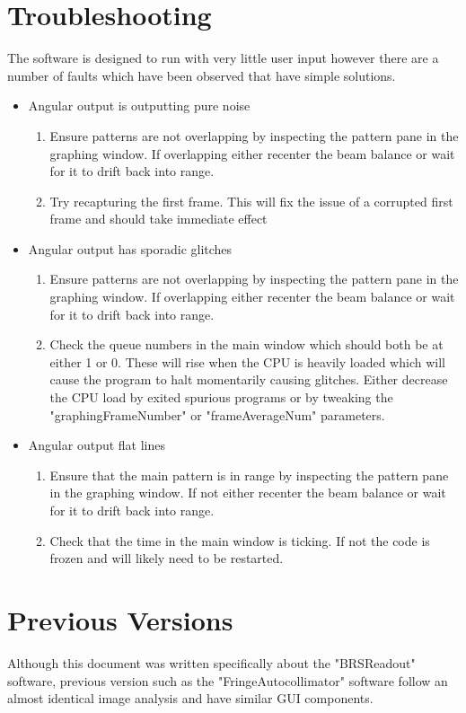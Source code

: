 \documentclass{article}
\begin{document}
\section{Troubleshooting}
The software is designed to run with very little user input however there are a number of faults which have been observed that have simple solutions.
\begin{itemize}
\item Angular output is outputting pure noise
\begin{enumerate}
\item Ensure patterns are not overlapping by inspecting the pattern pane in the graphing window. If overlapping either recenter the beam balance or wait for it to drift back into range.
\item Try recapturing the first frame. This will fix the issue of a corrupted first frame and should take immediate effect
\end{enumerate}
\item Angular output has sporadic glitches
\begin{enumerate}
\item Ensure patterns are not overlapping by inspecting the pattern pane in the graphing window. If overlapping either recenter the beam balance or wait for it to drift back into range.
\item Check the queue numbers in the main window which should both be at either 1 or 0. These will rise when the CPU is heavily loaded which will cause the program to halt momentarily causing glitches. Either decrease the CPU load by exited spurious programs or by tweaking the "graphingFrameNumber" or "frameAverageNum" parameters.
\end{enumerate}
\item Angular output flat lines
\begin{enumerate}
\item Ensure that the main pattern is in range by inspecting the pattern pane in the graphing window. If not either recenter the beam balance or wait for it to drift back into range.
\item Check that the time in the main window is ticking. If not the code is frozen and will likely need to be restarted.
\end{enumerate}
\end{itemize}
\section{Previous Versions}
Although this document was written specifically about the "BRSReadout" software, previous version such as the "FringeAutocollimator" software follow an almost identical image analysis and have similar GUI components.

{}
\end{document}
